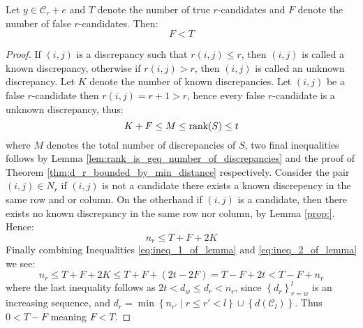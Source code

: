 \begin{proposition}\label{prop:false_is_less_than_true}
  Let $y \in \mathcal{C}_r + e$ and $T$ denote the number of true $r$-candidates and $F$ denote the number of false $r$-candidates. Then:
  \begin{equation*}
    F < T
  \end{equation*}
\end{proposition}
\begin{proof}
  If $(i, j)$ is a discrepancy such that $r(i, j) \leq r$, then $(i, j)$ is called a known discrepancy, otherwise if $r(i, j) > r$, then $(i, j)$ is called an unknown discrepancy. Let $K$ denote the number of known discrepancies. Let $(i, j)$ be a false $r$-candidate then $r(i, j) = r + 1 > r$, hence every false $r$-candidate is a unknown discrepancy, thus:
  \begin{equation}\label{eq:ineq_1_of_lemma}
    K + F \leq M \leq \textnormal{rank}(S) \leq t
  \end{equation}
  where $M$ denotes the total number of discrepancies of $S$, two final inequalities follows by Lemma \ref{lem:rank_is_geq_number_of_discrepancies} and the proof of Theorem \ref{thm:d_r_bounded_by_min_distance} respectively.
  Consider the pair $(i, j) \in N_r$ if $(i, j)$ is not a candidate there exists a known discrepency in the same row and or column. On the otherhand if $(i, j)$ is a candidate, then there exists no known discrepancy in the same row nor column, by Lemma \ref{prop:}. Hence:
  \begin{equation}\label{eq:ineq_2_of_lemma}
    n_r \leq T + F + 2K
  \end{equation}
  Finally combining Inequalities \eqref{eq:ineq_1_of_lemma} and \eqref{eq:ineq_2_of_lemma} we see:
  \begin{equation*}
    n_r \leq T + F + 2K \leq T + F + (2t - 2F) = T - F + 2t < T - F + n_r
  \end{equation*}
  where the last inequality follows as $2t < d_w \leq d_r < n_r$, since $\left\{d_r\right\}_{r = w}^l$ is an increasing sequence, and $d_r = \min \left\{n_{r'} \middle | r \leq r' < l\right\} \cup \left\{d(\mathcal{C}_{l})\right\}$. Thus $0 < T - F$ meaning $F < T$.
\end{proof}

